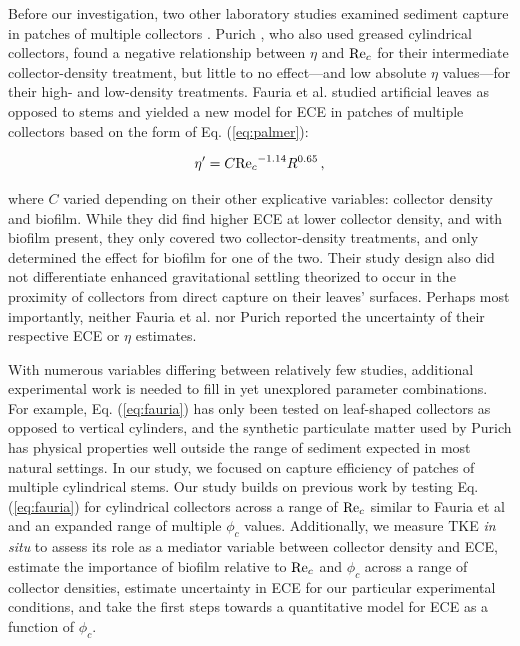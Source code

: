 \documentclass[geosciences,article,submit,moreauthors,pdftex]{Definitions/mdpi}
\begin{document}
Before our investigation, two other laboratory studies examined sediment capture in patches of multiple collectors \cite{purich2006capture,Fauria_2015}. Purich \cite{purich2006capture}, who also used greased cylindrical collectors, found a negative relationship between $\eta$ and $\mathrm{Re}_c$ for their intermediate collector-density treatment, but little to no effect---and low absolute $\eta$ values---for their high- and low-density treatments. Fauria et al. \cite{Fauria_2015} studied artificial leaves as opposed to stems and yielded a new model for ECE in patches of multiple collectors based on the form of Eq. (\ref{eq:palmer}):

\begin{equation}
    \eta^\prime=C{\mathrm{Re}_c}^{-1.14}R^{0.65}\,,
    \label{eq:fauria}
\end{equation}


\noindent where $C$ varied depending on their other explicative variables: collector density and biofilm. While they did find higher ECE at lower collector density, and with biofilm present, they only covered two collector-density treatments, and only determined the effect for biofilm for one of the two. Their study design also did not differentiate enhanced gravitational settling theorized to occur in the proximity of collectors from direct capture on their leaves' surfaces. Perhaps most importantly, neither Fauria et al. nor Purich reported the uncertainty of their respective ECE or $\eta$ estimates.

With numerous variables differing between relatively few studies, additional experimental work is needed to fill in yet unexplored parameter combinations. For example, Eq. (\ref{eq:fauria}) has only been tested on leaf-shaped collectors as opposed to vertical cylinders, and the synthetic particulate matter used by Purich \cite{purich2006capture} has physical properties well outside the range of sediment expected in most natural settings. In our study, we focused on capture efficiency of patches of multiple cylindrical stems. Our study builds on previous work by testing Eq. (\ref{eq:fauria}) for cylindrical collectors across a range of $\mathrm{Re}_c$ similar to Fauria et al \cite{Fauria_2015} and an expanded range of multiple $\phi_c$ values. Additionally, we measure TKE \textit{in situ} to assess its role as a mediator variable between collector density and ECE, estimate the importance of biofilm relative to $\mathrm{Re}_c$ and $\phi_c$ across a range of collector densities, estimate uncertainty in ECE for our particular experimental conditions, and take the first steps towards a quantitative model for ECE as a function of $\phi_c$.
\end{document}
